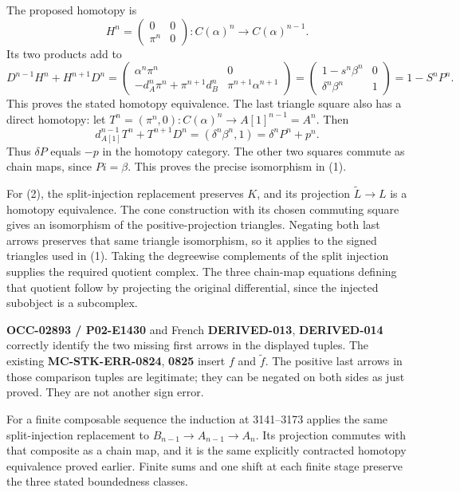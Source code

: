 The proposed homotopy is \[
H^n=\begin{pmatrix}0&0\\\pi^n&0\end{pmatrix}:
C(\alpha)^n\longrightarrow C(\alpha)^{n-1}.
\] Its two products add to \[
D^{n-1}H^n+H^{n+1}D^n
=\begin{pmatrix}
\alpha^n\pi^n&0\\
-d_A^n\pi^n+\pi^{n+1}d_B^n&\pi^{n+1}\alpha^{n+1}
\end{pmatrix}
=\begin{pmatrix}1-s^n\beta^n&0\\\delta^n\beta^n&1\end{pmatrix}
=1-S^nP^n.
\] This proves the stated homotopy equivalence. The last triangle square also has a direct homotopy:\allowbreak{} let \(T^n=(\pi^n,0):C(\alpha)^n\to A[1]^{n-1}=A^n\). Then \[
d_{A[1]}^{n-1}T^n+T^{n+1}D^n
=(\delta^n\beta^n,1)=\delta^nP^n+p^n.
\] Thus \(\delta P\) equals \(-p\) in the homotopy category. The other two squares commute as chain maps,\allowbreak{} since \(Pi=\beta\). This proves the precise isomorphism in (1)\allowbreak{}.

For (2)\allowbreak{},\allowbreak{} the split-injection replacement preserves \(K\),\allowbreak{} and its projection \(\widetilde L\to L\) is a homotopy equivalence. The cone construction with its chosen commuting square gives an isomorphism of the positive-projection triangles. Negating both last arrows preserves that same triangle isomorphism,\allowbreak{} so it applies to the signed triangles used in (1)\allowbreak{}. Taking the degreewise complements of the split injection supplies the required quotient complex. The three chain-map equations defining that quotient follow by projecting the original differential,\allowbreak{} since the injected subobject is a subcomplex.

\textbf{OCC-02893 /\allowbreak{} P02-E1430} and French \textbf{DERIVED-013},\allowbreak{} \textbf{DERIVED-014} correctly identify the two missing first arrows in the displayed tuples. The existing \textbf{MC-STK-ERR-0824},\allowbreak{} \textbf{0825} insert \(f\) and \(\widetilde f\). The positive last arrows in those comparison tuples are legitimate; they can be negated on both sides as just proved. They are not another sign error.

For a finite composable sequence the induction at 3141–\allowbreak{}3173 applies the same split-injection replacement to \(B_{n-1}\to A_{n-1}\to A_n\). Its projection commutes with that composite as a chain map,\allowbreak{} and it is the same explicitly contracted homotopy equivalence proved earlier. Finite sums and one shift at each finite stage preserve the three stated boundedness classes.

